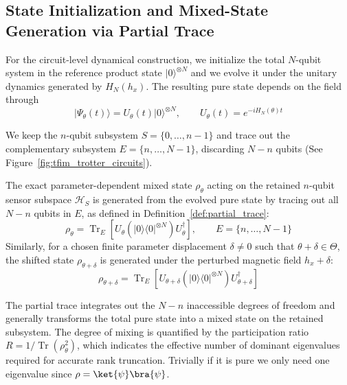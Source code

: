 \subsection{State Initialization and Mixed-State Generation via Partial Trace}
For the circuit-level dynamical construction, we initialize the total $N$-qubit system in the reference product state $|0\rangle^{\otimes N}$ and we evolve it under the unitary dynamics generated by $H_N(h_x)$. The resulting pure state depends on the field through
\begin{equation}
    |\Psi_\theta(t)\rangle=U_\theta(t)|0\rangle^{\otimes N},
    \qquad
    U_\theta(t)=e^{-iH_N(\theta)t}
    \label{eq:tfim_unitary_preparation}
\end{equation}


We keep the $n$-qubit subsystem $S=\{0,\ldots,n-1\}$ and trace out the complementary subsystem $E=\{n,\ldots,N-1\}$, discarding $N-n$ qubits (See Figure~\ref{fig:tfim_trotter_circuits}).

\begin{definition}
    The exact parameter-dependent mixed state $\rho_\theta$ acting on the retained $n$-qubit sensor subspace $\mathcal{H}_S$ is generated from the evolved pure state by tracing out all $N-n$ qubits in $E$, as defined in Definition~\ref{def:partial_trace}:
    \begin{equation}
        \rho_\theta = \operatorname{Tr}_{E} \left[ U_\theta \left( |0\rangle\langle 0|^{\otimes N} \right) U_\theta^\dagger \right],
        \qquad E=\{n,\ldots,N-1\}
        \label{eq:partial_trace_state}
    \end{equation}
    Similarly, for a chosen finite parameter displacement $\delta\neq0$ such that $\theta+\delta\in\Theta$, the shifted state $\rho_{\theta+\delta}$ is generated under the perturbed magnetic field $h_x+\delta$:
    \begin{equation}
        \rho_{\theta+\delta} = \operatorname{Tr}_{E} \left[ U_{\theta+\delta} \left( |0\rangle\langle 0|^{\otimes N} \right) U_{\theta+\delta}^\dagger \right]
    \end{equation}
\end{definition}

\begin{remark}
    The partial trace integrates out the $N-n$ inaccessible degrees of freedom and generally transforms the total pure state into a mixed state on the retained subsystem. The degree of mixing is quantified by the participation ratio $R = 1 / \operatorname{Tr}(\rho_\theta^2)$, which indicates the effective number of dominant eigenvalues required for accurate rank truncation. Trivially if it is pure we only need one eigenvalue since $\rho = \ket{\psi}\bra{\psi}$.
\end{remark}

